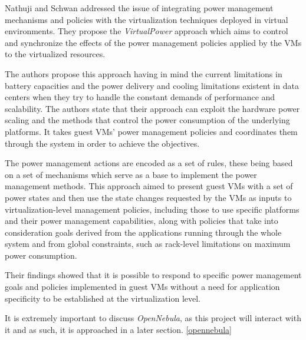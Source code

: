 Nathuji and Schwan addressed the issue of integrating power management mechanisms and policies with the virtualization techniques deployed in virtual environments. They propose the \textit{VirtualPower} approach which aims to control and synchronize the effects of the power management policies applied by the VMs to the virtualized resources. 

The authors propose this approach having in mind the current limitations in battery capacities and the power delivery and cooling limitations existent in data centers when they try to handle the constant demands of performance and scalability. The authors state that their approach  can exploit the hardware power scaling and the methods that control the power consumption of the underlying platforms. It takes guest VMs' power management policies and coordinates them through the system in order to achieve the objectives. 

The power management actions are encoded as a set of rules, these being based on a set of mechanisms which serve as a base to implement the power management methods. This approach aimed to present guest VMs with a set of power states and then use the state changes requested by the VMs as inputs to virtualization-level management policies, including those to use specific platforms and their power management capabilities, along with policies that take into consideration goals derived from the applications running through the whole system and from global constraints, such as rack-level limitations on maximum power consumption. 

Their findings showed that it is possible to respond to specific power management goals and policies implemented in guest VMs without a need for application specificity to be established at the virtualization level. \cite{virtualpower}

It is extremely important to discuss \textit{OpenNebula}, as this project will interact with it and as such, it is approached in a later section. \ref{opennebula}

